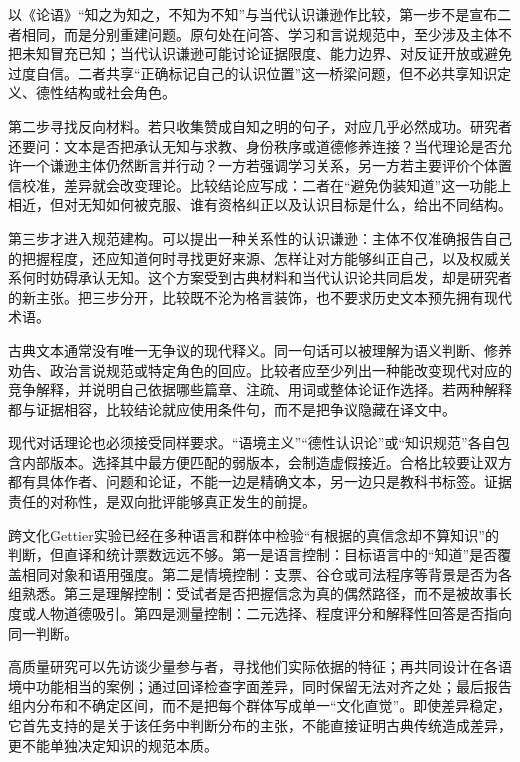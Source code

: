 以《论语》“知之为知之，不知为不知”与当代认识谦逊作比较，第一步不是宣布二者相同，而是分别重建问题。原句处在问答、学习和言说规范中，至少涉及主体不把未知冒充已知；当代认识谦逊可能讨论证据限度、能力边界、对反证开放或避免过度自信。二者共享“正确标记自己的认识位置”这一桥梁问题，但不必共享知识定义、德性结构或社会角色\parencite[2.17]{analects2003}。

第二步寻找反向材料。若只收集赞成自知之明的句子，对应几乎必然成功。研究者还要问：文本是否把承认无知与求教、身份秩序或道德修养连接？当代理论是否允许一个谦逊主体仍然断言并行动？一方若强调学习关系，另一方若主要评价个体置信校准，差异就会改变理论。比较结论应写成：二者在“避免伪装知道”这一功能上相近，但对无知如何被克服、谁有资格纠正以及认识目标是什么，给出不同结构。

第三步才进入规范建构。可以提出一种关系性的认识谦逊：主体不仅准确报告自己的把握程度，还应知道何时寻找更好来源、怎样让对方能够纠正自己，以及权威关系何时妨碍承认无知。这个方案受到古典材料和当代认识论共同启发，却是研究者的新主张。把三步分开，比较既不沦为格言装饰，也不要求历史文本预先拥有现代术语\parencite{norden2017}。

古典文本通常没有唯一无争议的现代释义。同一句话可以被理解为语义判断、修养劝告、政治言说规范或特定角色的回应。比较者应至少列出一种能改变现代对应的竞争解释，并说明自己依据哪些篇章、注疏、用词或整体论证作选择。若两种解释都与证据相容，比较结论就应使用条件句，而不是把争议隐藏在译文中。

现代对话理论也必须接受同样要求。“语境主义”“德性认识论”或“知识规范”各自包含内部版本。选择其中最方便匹配的弱版本，会制造虚假接近。合格比较要让双方都有具体作者、问题和论证，不能一边是精确文本，另一边只是教科书标签。证据责任的对称性，是双向批评能够真正发生的前提。

跨文化Gettier实验已经在多种语言和群体中检验“有根据的真信念却不算知识”的判断\parencite{machery2017}，但直译和统计票数远远不够。第一是语言控制：目标语言中的“知道”是否覆盖相同对象和语用强度。第二是情境控制：支票、谷仓或司法程序等背景是否为各组熟悉。第三是理解控制：受试者是否把握信念为真的偶然路径，而不是被故事长度或人物道德吸引。第四是测量控制：二元选择、程度评分和解释性回答是否指向同一判断。

高质量研究可以先访谈少量参与者，寻找他们实际依据的特征；再共同设计在各语境中功能相当的案例；通过回译检查字面差异，同时保留无法对齐之处；最后报告组内分布和不确定区间，而不是把每个群体写成单一“文化直觉”。即使差异稳定，它首先支持的是关于该任务中判断分布的主张，不能直接证明古典传统造成差异，更不能单独决定知识的规范本质。

